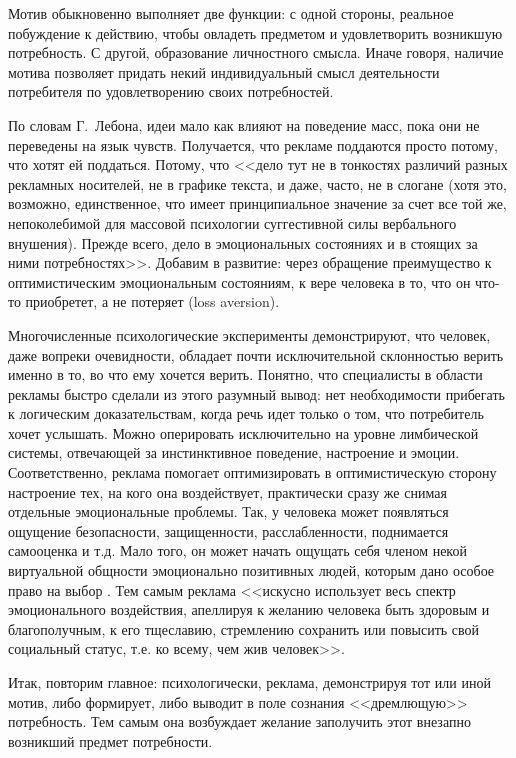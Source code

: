 Мотив обыкновенно выполняет две функции: с одной стороны, реальное побуждение
к действию, чтобы овладеть предметом и удовлетворить возникшую потребность.
С другой, образование личностного смысла. Иначе говоря, наличие мотива
позволяет придать некий индивидуальный смысл деятельности потребителя по
удовлетворению своих потребностей.

По словам Г.~Лебона, идеи мало как влияют на поведение масс, пока они не переведены
на язык чувств. Получается, что рекламе поддаются просто потому, что хотят
ей поддаться. Потому, что <<дело тут не в тонкостях различий разных рекламных
носителей, не в графике текста, и даже, часто, не в слогане (хотя это,
возможно, единственное, что имеет принципиальное значение за счет все той же,
непоколебимой для массовой психологии суггестивной силы вербального внушения).
Прежде всего, дело в эмоциональных состояниях и в стоящих за ними потребностях>>\autocite[][315]{olshansky}.
Добавим в развитие: через обращение преимущество к оптимистическим эмоциональным
состояниям, к вере человека в то, что он что-то приобретет, а не потеряет
(loss aversion).

Многочисленные психологические эксперименты демонстрируют, что человек,
даже вопреки очевидности, обладает почти исключительной склонностью верить
именно в то, во что ему хочется верить. Понятно, что специалисты в области
рекламы быстро сделали из этого разумный вывод: нет необходимости прибегать
к логическим доказательствам, когда речь идет только о том, что потребитель
хочет услышать. Можно оперировать исключительно на уровне лимбической системы,
отвечающей за инстинктивное поведение, настроение и эмоции. Соответственно,
реклама помогает оптимизировать в оптимистическую сторону настроение тех,
на кого она воздействует, практически сразу же снимая отдельные эмоциональные
проблемы. Так, у человека может появляться ощущение безопасности, защищенности,
расслабленности, поднимается самооценка и т.д. Мало того, он может начать
ощущать себя членом некой виртуальной общности эмоционально позитивных людей,
которым дано особое право на выбор
\autocite{ariely2009predictably}\autocite{dittrich2008upside}\autocite{martin2012}\autocite{lindstrom2010}.
Тем самым реклама <<искусно использует весь спектр эмоционального воздействия,
апеллируя к желанию человека быть здоровым и благополучным, к его тщеславию,
стремлению сохранить или повысить свой социальный статус, т.е. ко всему, чем
жив человек>>\autocite{feofanov1987}.

Итак, повторим главное: психологически, реклама, демонстрируя тот или иной мотив,
либо формирует, либо выводит в поле сознания <<дремлющую>> потребность.
Тем самым она возбуждает желание заполучить этот внезапно возникший предмет
потребности.

